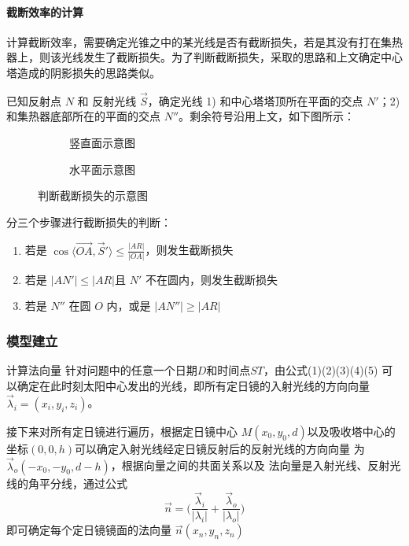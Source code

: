 \documentclass[../main.tex]{subfiles}
\begin{document}
\paragraph{截断效率的计算}
计算截断效率，需要确定光锥之中的某光线是否有截断损失，若是其没有打在集热器上，则该光线发生了截断损失。为了判断截断损失，采取的思路和上文确定中心塔造成的阴影损失的思路类似。

已知反射点 \(N\) 和 反射光线 \(\vec S\)，确定光线 1) 和中心塔塔顶所在平面的交点 \(N'\)；2) 和集热器底部所在的平面的交点 \(N''\)。剩余符号沿用上文，如下图所示：

\begin{figure}[H]
\centering
\begin{subfigure}[b]{0.4\textwidth}
\centering

\caption{竖直面示意图}
\end{subfigure}
\begin{subfigure}[b]{0.4\textwidth}
\centering

\caption{水平面示意图}
\end{subfigure}
\caption{判断截断损失的示意图}
\end{figure}

分三个步骤进行截断损失的判断：
\begin{enumerate}
\item 若是 \( \displaystyle\cos \langle \overrightarrow{OA}, \vec S' \rangle\le \frac{\vert AR \vert}{\vert OA \vert}\)，则发生截断损失
\item 若是 \(\vert AN'\vert \le \vert AR \vert\)且 \(N'\) 不在圆内，则发生截断损失
\item 若是 \(N''\) 在圆 \(O\) 内，或是 \(\vert AN'' \vert \ge \vert AR \vert\)
\end{enumerate}


\subsubsection{模型建立}
计算法向量
针对问题中的任意一个日期\(D\)和时间点\(ST\)，由公式(1)(2)(3)(4)(5)
可以确定在此时刻太阳中心发出的光线，即所有定日镜的入射光线的方向向量\(\vec \lambda_i=(x_i,y_i,z_i)\)。

接下来对所有定日镜进行遍历，根据定日镜中心
\(M(x_0,y_0,d)\)以及吸收塔中心的坐标\((0,0,h)\)可以确定入射光线经定日镜反射后的反射光线的方向向量
为 \(\vec \lambda_o (−x_0,−y_0, d −h)\)，根据向量之间的共面关系以及
法向量是入射光线、反射光线的角平分线，通过公式
\begin{equation}
\vec n = \big(\frac{\vec \lambda_{i}}{\vert \lambda_{i} \vert} + \frac{\vec \lambda_{o}}{\vert \lambda_{o} \vert}\big)
\end{equation}
即可确定每个定日镜镜面的法向量 \(\vec n (x_{n}, y_{n}, z_{n})\)
\end{document}
